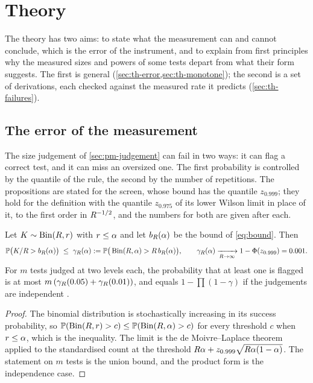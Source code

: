 \section{Theory}
\label{sec:theory}

The theory has two aims: to state what the measurement can and cannot conclude, which is the error of the instrument, and to explain from first principles why the measured sizes and powers of some tests depart from what their form suggests.
The first is general (\cref{sec:th-error,sec:th-monotone}); the second is a set of derivations, each checked against the measured rate it predicts (\cref{sec:th-failures}).

\subsection{The error of the measurement}
\label{sec:th-error}

The size judgement of \cref{sec:pm-judgement} can fail in two ways: it can flag a correct test, and it can miss an oversized one.
The first probability is controlled by the quantile of the rule, the second by the number of repetitions.
The propositions are stated for the screen, whose bound has the quantile $z_{0.999}$; they hold for the definition with the quantile $z_{0.975}$ of its lower Wilson limit in place of it, to the first order in $R^{-1/2}$, and the numbers for both are given after each.

\begin{proposition}
\label{prop:false-flag}
Let $K\sim\operatorname{Bin}(R,r)$ with $r\le\alpha$ and let $b_R(\alpha)$ be the bound of \eqref{eq:bound}. Then
\begin{equation}
\mathbb{P}\big(K/R>b_R(\alpha)\big)\;\le\;\gamma_R(\alpha):=\mathbb{P}\big(\operatorname{Bin}(R,\alpha)>R\,b_R(\alpha)\big),\qquad
\gamma_R(\alpha)\xrightarrow[R\to\infty]{}1-\Phi(z_{0.999})=0.001 .
\label{eq:false-flag}
\end{equation}
For $m$ tests judged at two levels each, the probability that at least one is flagged is at most $m\,(\gamma_R(0.05)+\gamma_R(0.01))$, and equals $1-\prod(1-\gamma)$ if the judgements are independent \citep{sidak1967}.
\end{proposition}
\begin{proof}
The binomial distribution is stochastically increasing in its success probability, so $\mathbb{P}(\operatorname{Bin}(R,r)>c)\le\mathbb{P}(\operatorname{Bin}(R,\alpha)>c)$ for every threshold $c$ when $r\le\alpha$, which is the inequality.
The limit is the de Moivre--Laplace theorem applied to the standardised count at the threshold $R\alpha+z_{0.999}\sqrt{R\alpha(1-\alpha)}$.
The statement on $m$ tests is the union bound, and the product form is the independence case.
\end{proof}


